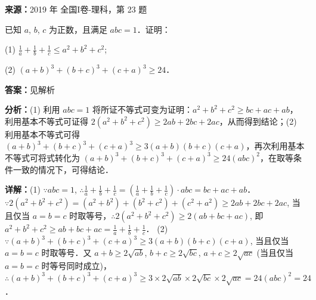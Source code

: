 \begin{question}[points=10]
\textbf{来源：}2019 年 全国I卷-理科，第 23 题\par
[选修 4—5：不等式选讲]

已知 $a$, $b$, $c$ 为正数，且满足 $abc = 1$．证明：

(1) $\frac{1}{a} + \frac{1}{b} + \frac{1}{c} \le a^2 + b^2 + c^2$;

(2) $(a + b)^3 + (b + c)^3 + (c + a)^3 \ge 24$．
\begin{solution}
\textbf{答案：}见解析

\textbf{分析：}(1) 利用 $abc = 1$ 将所证不等式可变为证明：$a^2 + b^2 + c^2 \ge bc + ac + ab$，利用基本不等式可证得 $2(a^2 + b^2 + c^2) \ge 2ab + 2bc + 2ac$，从而得到结论；(2) 利用基本不等式可得 $(a+b)^3 + (b+c)^3 + (c+a)^3 \ge 3(a+b)(b+c)(c+a)$，再次利用基本不等式可将式转化为 $(a+b)^3 + (b+c)^3 + (c+a)^3 \ge 24(abc)^2$，在取等条件一致的情况下，可得结论．

\textbf{详解：}(1) $\because abc = 1$, $\therefore \frac{1}{a} + \frac{1}{b} + \frac{1}{c} = \left(\frac{1}{a} + \frac{1}{b} + \frac{1}{c}\right) \cdot abc = bc + ac + ab$．$\because 2(a^2 + b^2 + c^2) = (a^2 + b^2) + (b^2 + c^2) + (c^2 + a^2) \ge 2ab + 2bc + 2ac$, 当且仅当 $a = b = c$ 时取等号，$\therefore 2(a^2 + b^2 + c^2) \ge 2(ab + bc + ac)$, 即 $a^2 + b^2 + c^2 \ge ab + bc + ac = \frac{1}{a} + \frac{1}{b} + \frac{1}{c}$．
(2) $\because (a+b)^3 + (b+c)^3 + (c+a)^3 \ge 3(a+b)(b+c)(c+a)$, 当且仅当 $a = b = c$ 时取等号．又 $a+b \ge 2\sqrt{ab}$, $b+c \ge 2\sqrt{bc}$, $a+c \ge 2\sqrt{ac}$ (当且仅当 $a = b = c$ 时等号同时成立)，$\therefore (a+b)^3 + (b+c)^3 + (c+a)^3 \ge 3 \times 2\sqrt{ab} \times 2\sqrt{bc} \times 2\sqrt{ac} = 24(abc)^2 = 24$．
\end{solution}
\end{question}


